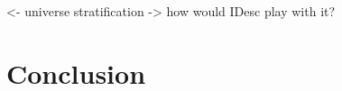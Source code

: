 \documentclass[preprint, authoryear]{sigplanconf}
\newenvironment{structure}{\footnotesize\verbatim}{\endverbatim}
\begin{document}
\begin{structure}
<- universe stratification
    -> how would IDesc play with it?
\end{structure}



\section{Conclusion}

\begin{structure}
\end{structure}















\end{document}
